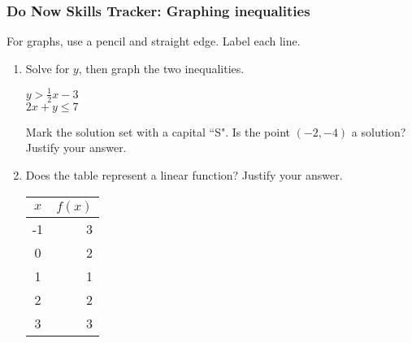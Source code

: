 \documentclass[12pt, twoside]{article}
\begin{document}
\subsubsection*{Do Now Skills Tracker: Graphing inequalities}
For graphs, use a pencil and straight edge. Label each line.
  \begin{enumerate}

\item Solve for $y$, then graph the two inequalities.

  \begin{multicols}{2}
    $y > \frac{1}{2}x-3$ \\
    $2x+y \leq 7$
  \end{multicols}
  \vspace{2.5cm}

  \begin{center} %
  \end{center}

  Mark the solution set with a capital ``S". Is the point $(-2,-4)$ a solution? Justify your answer.
\newpage

\item Does the table represent a linear function? Justify your answer.
  \renewcommand{\arraystretch}{1.6}
    \begin{center}
      \begin{tabular}{|c|r|}
      \hline
      $x$ & $f(x)$\\
      \hline
      -1 & 3 \\
      \hline
      0 & 2 \\
      \hline
      1 & 1 \\
      \hline
      2 & 2 \\
      \hline
      3 & 3 \\
      \hline
      \end{tabular}
    \end{center}
  \end{enumerate}
  \newpage
  \setcounter{page}{1}
\end{document}

